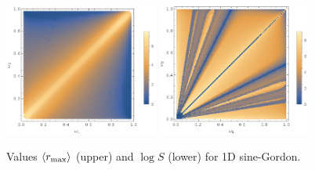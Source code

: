 \documentclass[%
reprint,
superscriptaddress,
amsmath,amssymb,
aps,
prl,
floatfix,
nofootinbib
]{revtex4-1}
\begin{document}
 \begin{figure}
  \centering
  \includegraphics[width=0.45\textwidth]{plot/r_max-sine-1d.png}\vskip10pt
  \includegraphics[width=0.45\textwidth]{plot/slow-mode-sine-1d.png}
  \caption{Values $\langle r_{\rm max}\rangle$ (upper) and  $\log{S}$ (lower) for 1D sine-Gordon.}\label{sine-1d}
\end{figure}

\end{document}
